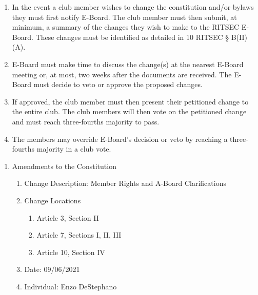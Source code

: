 \begin{enumerate}
  \item In the event a club member wishes to change the constitution and/or
    bylaws they must first notify E-Board. The club member must then submit, at
    minimum, a summary of the changes they wish to make to the RITSEC E-Board.
    These changes must be identified as detailed in 10 RITSEC § B(II)(A).
  \item E-Board must make time to discuss the change(s) at the nearest E-Board
    meeting or, at most, two weeks after the documents are received. The
    E-Board must decide to veto or approve the proposed changes.
  \item If approved, the club member must then present their petitioned change
    to the entire club. The club members will then vote on the petitioned
    change and must reach three-fourths majority to pass.
  \item The members may override E-Board's decision or veto by reaching a
    three-fourths majority in a club vote.
\end{enumerate}


\begin{enumerate}
  \item Amendments to the Constitution
  \begin{enumerate}
    \item Change Description: Member Rights and A-Board Clarifications
    \item Change Locations
    \begin{enumerate}
      \item Article 3, Section II
      \item Article 7, Sections I, II, III
      \item Article 10, Section IV
    \end{enumerate} 
    \item Date: 09/06/2021
    \item Individual: Enzo DeStephano
  \end{enumerate}
\end{enumerate}